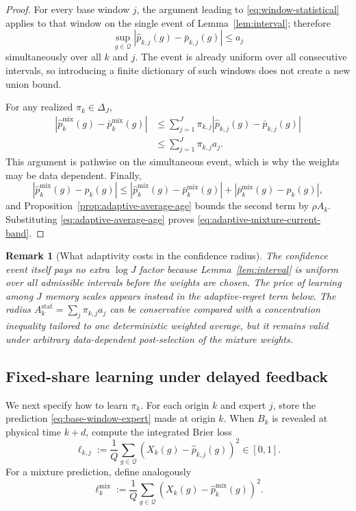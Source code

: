 \documentclass[11pt]{article}
\newtheorem{remark}[theorem]{Remark}
\newcommand{\Q}{\mathcal{Q}}
\newcommand{\1}{\mathbf{1}}
\begin{document}
\begin{proof}
For every base window $j$, the argument leading to
\eqref{eq:window-statistical} applies to that window on the single event of
Lemma~\ref{lem:interval}; therefore
\[
    \sup_{g\in\Q}
    |\widehat p_{k,j}(g)-\bar p_{k,j}(g)|
    \le a_j
\]
simultaneously over all $k$ and $j$.  The event is already uniform over all
consecutive intervals, so introducing a finite dictionary of such windows does
not create a new union bound.

For any realized $\pi_k\in\Delta_J$,
\begin{align*}
    \left|
        \widehat p_k^{\mathrm{mix}}(g)
        -
        \bar p_k^{\mathrm{mix}}(g)
    \right|
    &\le
    \sum_{j=1}^J
    \pi_{k,j}
    |\widehat p_{k,j}(g)-\bar p_{k,j}(g)|
    \\
    &\le
    \sum_{j=1}^J\pi_{k,j}a_j.
\end{align*}
This argument is pathwise on the simultaneous event, which is why the weights
may be data dependent.  Finally,
\[
    |\widehat p_k^{\mathrm{mix}}(g)-p_k(g)|
    \le
    |\widehat p_k^{\mathrm{mix}}(g)-\bar p_k^{\mathrm{mix}}(g)|
    +
    |\bar p_k^{\mathrm{mix}}(g)-p_k(g)|,
\]
and Proposition~\ref{prop:adaptive-average-age} bounds the second term by
$\rho A_k$.  Substituting \eqref{eq:adaptive-average-age} proves
\eqref{eq:adaptive-mixture-current-band}.
\end{proof}

\begin{remark}[What adaptivity costs in the confidence radius]
The confidence event itself pays no extra $\log J$ factor because
Lemma~\ref{lem:interval} is uniform over all admissible intervals before the
weights are chosen.  The price of learning among $J$ memory scales appears
instead in the adaptive-regret term below.  The radius
$A_k^{\mathrm{stat}}=\sum_j\pi_{k,j}a_j$ can be conservative compared with a
concentration inequality tailored to one deterministic weighted average, but
it remains valid under arbitrary data-dependent post-selection of the mixture
weights.
\end{remark}

\subsection{Fixed-share learning under delayed feedback}

We next specify how to learn $\pi_k$.  For each origin $k$ and expert $j$, store
the prediction \eqref{eq:base-window-expert} made at origin $k$.  When $B_k$ is
revealed at physical time $k+d$, compute the integrated Brier loss
\begin{equation}
    \ell_{k,j}
    :=
    \frac1Q
    \sum_{g\in\Q}
    \left(
        X_k(g)-\widehat p_{k,j}(g)
    \right)^2
    \in[0,1].
    \label{eq:expert-brier-loss}
\end{equation}
For a mixture prediction, define analogously
\begin{equation}
    \ell_k^{\mathrm{mix}}
    :=
    \frac1Q
    \sum_{g\in\Q}
    \left(
        X_k(g)-\widehat p_k^{\mathrm{mix}}(g)
    \right)^2.
    \label{eq:mixture-brier-loss}
\end{equation}
\end{document}
